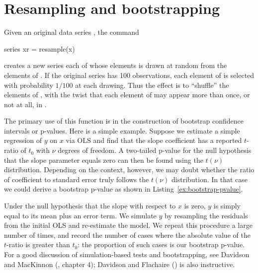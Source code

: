 \section{Resampling and bootstrapping}
\label{sec:resampling}

Given an original data series , the command
%
\begin{code}
series xr = resample(x)
\end{code}
%
creates a new series each of whose elements is drawn at random from
the elements of .  If the original series has 100
observations, each element of  is selected with probability
$1/100$ at each drawing.  Thus the effect is to ``shuffle'' the
elements of , with the twist that each element of
 may appear more than once, or not at all, in .

The primary use of this function is in the construction of bootstrap
confidence intervals or p-values.  Here is a simple example.  Suppose
we estimate a simple regression of $y$ on $x$ via OLS and find that
the slope coefficient has a reported $t$-ratio of $t_0$ with $\nu$ degrees
of freedom. A two-tailed p-value for the null hypothesis that the
slope parameter equals zero can then be found using the $t(\nu)$
distribution.  Depending on the context, however, we may doubt whether
the ratio of coefficient to standard error truly follows the $t(\nu)$
distribution.  In that case we could derive a bootstrap p-value as
shown in Listing~\ref{ex:bootstrap-pvalue}.  

Under the null hypothesis that the slope with respect to $x$ is zero,
$y$ is simply equal to its mean plus an error term.  We simulate $y$
by resampling the residuals from the initial OLS and re-estimate the
model.  We repeat this procedure a large number of times, and record
the number of cases where the absolute value of the $t$-ratio is
greater than $t_0$: the proportion of such cases is our bootstrap
p-value.  For a good discussion of simulation-based tests and
bootstrapping, see Davidson and MacKinnon
(\citeyear{davidson-mackinnon04}, chapter 4); Davidson and Flachaire
(\citeyear{davidson-flachaire01}) is also instructive.

\begin{script}[htbp]
\end{script}
    

